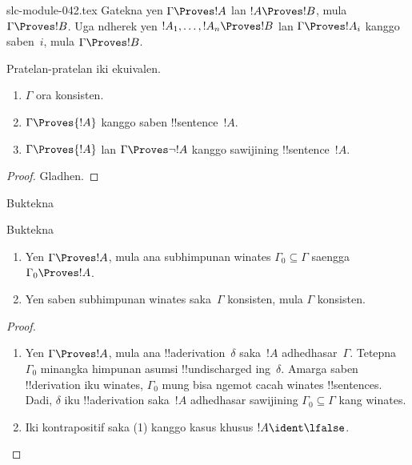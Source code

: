 \begin{filecontents*}[overwrite]{slc-module-042.tex}
Gatekna yen $\Gamma \Proves !A$ lan $!A \Proves !B$, mula $\Gamma
\Proves !B$. Uga ndherek yen $!A_1, \dots, !A_n \Proves !B$ lan
$\Gamma \Proves !A_i$ kanggo saben~$i$, mula $\Gamma \Proves !B$.

\begin{prop}
Pratelan-pratelan iki ekuivalen.
    \begin{enumerate}
      \item \( \Gamma \) ora konsisten.
      \item \( \Gamma \Proves {!A} \) kanggo saben !!{sentence}~\( {!A} \).
      \item \( \Gamma \Proves {!A} \) lan \( \Gamma \Proves \lnot {!A} \) kanggo sawijining !!{sentence}~\( {!A} \).
    \end{enumerate}
\end{prop}

\begin{proof}
Gladhen.
\end{proof}

\begin{prob}
Buktekna 
\end{prob}
\tagendprob

\begin{prob}
Buktekna 
\end{prob}
\tagendprob

\begin{prop}[Kekompakan]
  \begin{enumerate}
  \item Yen $\Gamma \Proves !A$, mula ana subhimpunan winates
    $\Gamma_0 \subseteq \Gamma$ saengga $\Gamma_0 \Proves !A$.
  \item Yen saben subhimpunan winates saka~$\Gamma$ konsisten,
    mula $\Gamma$ konsisten.
  \end{enumerate}
\end{prop}

\begin{proof}
  \begin{enumerate}
    \item Yen $\Gamma \Proves !A$, mula ana
      !!a{derivation}~$\delta$ saka~$!A$ adhedhasar~$\Gamma$. Tetepna
      $\Gamma_0$ minangka himpunan asumsi !!{undischarged} ing~$\delta$.
      Amarga saben !!{derivation} iku winates, $\Gamma_0$ mung bisa
      ngemot cacah winates !!{sentence}s. Dadi, $\delta$ iku
      !!a{derivation} saka~$!A$ adhedhasar sawijining $\Gamma_0
      \subseteq \Gamma$ kang winates.
    \item Iki kontrapositif saka (1) kanggo kasus khusus $!A \ident
      \lfalse$.
  \end{enumerate}
\end{proof}


\end{filecontents*}

